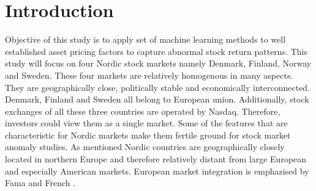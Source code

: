 \documentclass{article}
\begin{document}
\section{Introduction} \label{Introduction}


Objective of this study is to apply set of machine learning methods to well established asset pricing factors to capture abnormal stock return patterns. This study will focus on four Nordic stock markets namely Denmark, Finland, Norway and Sweden. These four markets are relatively homogenous in many aspects. They are geographically close, politically stable and economically interconnected. Denmark, Finland and Sweden all belong to European union. Additionally, stock exchanges of all these three countries are operated by Nasdaq. Therefore, investors could view them as a single market. Some of the features that are characteristic for Nordic markets make them fertile ground for stock market anomaly studies. As mentioned Nordic countries are geographically closely located in northern Europe and therefore relatively distant from large European and especially American markets. European market integration is emphazised by Fama and French \citeyear{FAMA2012457}. 
\end{document}

